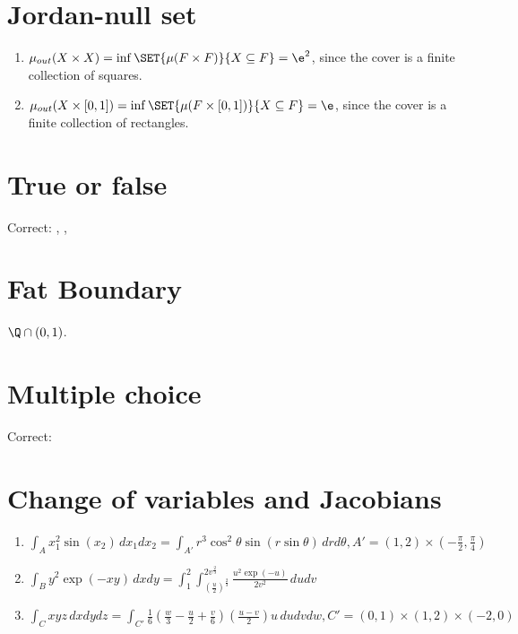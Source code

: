 \documentclass{article}
\begin{document}

\section{Jordan-null set}
\begin{enumerate}
    \item $\mu_{out}(X \times X) = \inf \SET{\mu(F \times F)}{X \subseteq F} = \e^2$, since the cover is a finite collection of squares. 
    \item $\mu_{out}(X \times [0, 1]) = \inf \SET{\mu(F \times [0, 1])}{X \subseteq F} = \e$, since the cover is a finite collection of rectangles. 
\end{enumerate}

\section{True or false}
Correct: , , 

\section{Fat Boundary}
$\Q \cap (0, 1)$. 

\section{Multiple choice}
Correct: 

\section{Change of variables and Jacobians}
\begin{enumerate}
    \item $\int_A x_1^2 \sin(x_2) \, dx_1 dx_2 = \int_{A'} r^3 \cos^2 \theta \sin(r \sin \theta)\,dr d\theta, A' = (1, 2) \times \left(-\frac{\pi}{2}, \frac{\pi}{4}\right)$ 
    
    \item $\int_B y^2 \exp(-xy)\, dx dy = \int_{1}^{2} \int_{\left(\frac{u}{2}\right)^{\frac{2}{3}}}^{2v^{\frac{2}{3}}}\frac{u^2 \exp(-u)}{2v^2} \, du dv$  
    
    \item $\int_C xyz \, dx dy dz = \int_{C'} \frac{1}{6}\left(\frac{w}{3} - \frac{u}{2} + \frac{v}{6}\right) \left(\frac{u - v}{2}\right) u \, du dv dw, 
    C' = (0, 1) \times (1, 2) \times (-2, 0)$ 
\end{enumerate}
\end{document}
